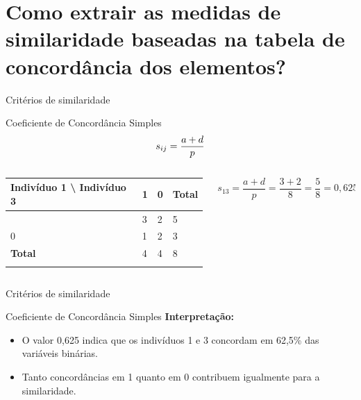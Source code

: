 \documentclass[
  ignorenonframetext,
  aspectratio=169,
]{beamer}
\newcounter{none} %
\begin{document}
\section{\texorpdfstring{Como extrair as \textbf{medidas de
similaridade} baseadas na \textbf{tabela de concordância} dos
elementos?}{Como extrair as medidas de similaridade baseadas na tabela de concordância dos elementos?}}\label{como-extrair-as-medidas-de-similaridade-baseadas-na-tabela-de-concorduxe2ncia-dos-elementos}

\begin{frame}{Critérios de similaridade}
\protect{}\label{crituxe9rios-de-similaridade}
\begin{block}{Coeficiente de Concordância Simples}
\protect{}\label{coeficiente-de-concorduxe2ncia-simples}
\[\Large s_{ij} = \displaystyle{\frac{a + d}{p}}\]

\begin{columns}[T]
\begin{column}{0.5\linewidth}
{\def\LTcaptype{none} %
\begin{longtable}[]{@{}llll@{}}
\toprule\noalign{}
Indivíduo 1 \textbackslash{} Indivíduo 3 & 1 & 0 & Total \\
\midrule\noalign{}
\endhead
1 & 3 & 2 & 5 \\
0 & 1 & 2 & 3 \\
\textbf{Total} & 4 & 4 & 8 \\
\bottomrule\noalign{}
\end{longtable}
}
\end{column}

\begin{column}{0.5\linewidth}
\[
s_{13} = \dfrac{a + d}{p}
               = \dfrac{3 + 2}{8}
               = \dfrac{5}{8}
               = 0,625
\]
\end{column}
\end{columns}
\end{block}
\end{frame}

\begin{frame}{Critérios de similaridade}
\protect{}\label{crituxe9rios-de-similaridade-1}
\begin{block}{Coeficiente de Concordância Simples}
\protect{}\label{coeficiente-de-concorduxe2ncia-simples-1}
\textbf{Interpretação:}

\begin{itemize}
\item
  O valor 0,625 indica que os indivíduos 1 e 3 concordam em 62,5\% das
  variáveis binárias.
\item
  Tanto concordâncias em 1 quanto em 0 contribuem igualmente para a
  similaridade.
\end{itemize}
\end{block}
\end{frame}
\end{document}
